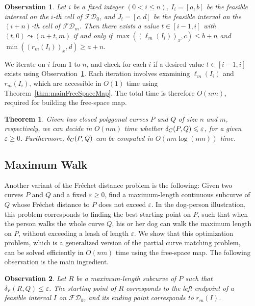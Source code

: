\documentclass[12pt]{dalthesis}
\newtheorem{theorem}{Theorem}
\newtheorem{obs}{Observation}
\newcommand{\lee}{\leqslant}
\newcommand{\gee}{\geqslant}
\newcommand{\eps}{\varepsilon}
\newcommand{\Frechet}{Fr\'echet }
\newcommand{\distF}{\delta_F}
\newcommand{\fs}{free-space }
\newcommand{\FD}{\mathscr {FD}}
\newcommand{\reach}{\leadsto}
\newcommand{\lp}{\ell}
\newcommand{\rp}{r}
\begin{document}
\begin{obs} \label{obs:t}
	Let $i$ be a fixed integer $(0 < i \lee n)$,
	$I_i=[a,b]$ be the feasible interval on the $i$-th cell of $\FD_0$, and 
	$J_i=[c,d]$ be the feasible interval on the $(i+n)$-th cell of $\FD_m$.
	Then there exists a value $t \in [i-1,i]$ with $(t,0) \reach (n+t,m)$ if and only if 
	$\max((\lp_m(I_i))_x, c) \lee b+n$ and $\min((\rp_m(I_i))_x, d) \gee a+n$.
\end{obs}


We  iterate on $i$ from 1 to $n$,
and check for each $i$ if a desired value $t \in [i-1,i]$ exists using Observation~\ref{obs:t}. 
Each iteration involves examining $\lp_m(I_i)$ and $\rp_m(I_i)$,
which are accessible in $O(1)$ time using Theorem~\ref{thm:mainFreeSpaceMap}.
The total time is therefore $O(nm)$, required for building the \fs map.

\begin{theorem} \label{thm:closed}
	Given two closed polygonal curves $P$ and $Q$ of size $n$ and $m$, respectively,
	we can decide in $O(nm)$ time whether $\distC(P,Q) \lee \eps$, for a given $\eps \gee 0$.
	Furthermore, $\delta_C(P,Q)$ can be computed in $O(nm \log (nm))$ time.
\end{theorem}


\subsection{Maximum Walk}

Another variant of the \Frechet distance problem is 
the following:
Given two curves $P$ and $Q$ and a fixed $\eps \gee 0$, 
find a maximum-length continuous subcurve of $Q$ whose 
\Frechet distance to $P$ does not exceed $\eps$.
In the dog-person illustration, this problem
corresponds to finding the best starting point on $P$, 
such that when the person walks the whole curve $Q$,
his or her dog can walk the maximum length on $P$,
without exceeding a leash of length $\eps$. 
We show that this optimization problem,
which is a generalized version of the partial curve matching problem,
can be solved efficiently in $O(nm)$ time
using the \fs map. 
The following observation is the main ingredient.

\begin{obs} \label{obs:max}
	Let $R$ be a maximum-length subcurve of $P$ such that $\distF(R,Q) \lee \eps$.
	The starting point of $R$ corresponds to the left endpoint of a feasible interval $I$ on $\FD_0$,
	and its ending point corresponds to $\rp_m(I)$. 
\end{obs}
\end{document}
